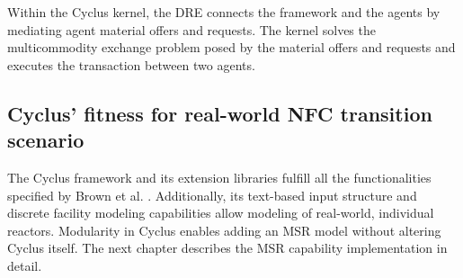 Within the Cyclus kernel, the \gls{DRE} connects
the framework and the agents by mediating agent material
offers and requests.
The kernel solves the multicommodity exchange problem
posed by the material offers and requests and executes
the transaction between two agents.

\subsection{Cyclus' fitness for real-world \gls{NFC} transition scenario}
The Cyclus framework and its extension libraries fulfill all the functionalities
specified by Brown et al. \cite{brown_identification_2016}.  Additionally,
its text-based input structure and discrete facility modeling capabilities
allow modeling of real-world, individual reactors. 
Modularity in Cyclus enables adding an \gls{MSR} model without altering Cyclus
itself. The next chapter describes the \gls{MSR} capability implementation
in detail.

